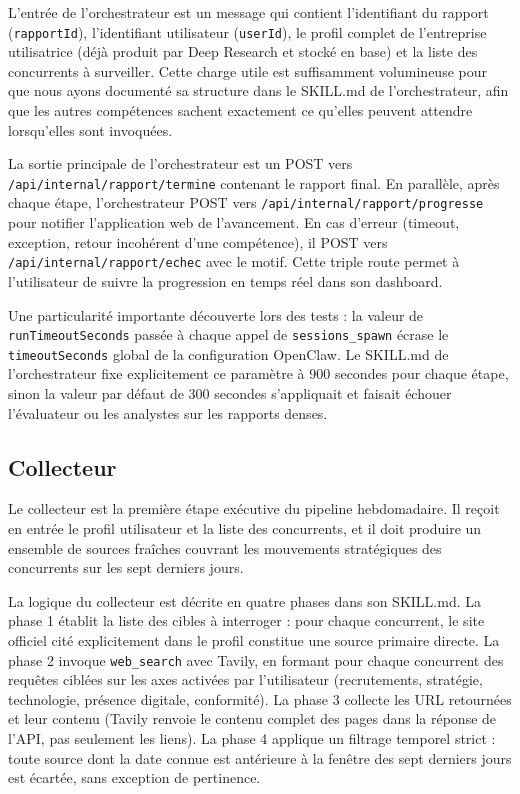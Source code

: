 \documentclass[12pt,a4paper,openany]{report}
\begin{document}
L'entrée de l'orchestrateur est un message qui contient l'identifiant du rapport (\texttt{rapportId}), l'identifiant utilisateur (\texttt{userId}), le profil complet de l'entreprise utilisatrice (déjà produit par Deep Research et stocké en base) et la liste des concurrents à surveiller. Cette charge utile est suffisamment volumineuse pour que nous ayons documenté sa structure dans le SKILL.md de l'orchestrateur, afin que les autres compétences sachent exactement ce qu'elles peuvent attendre lorsqu'elles sont invoquées.

La sortie principale de l'orchestrateur est un POST vers \texttt{/api/internal/rapport/termine} contenant le rapport final. En parallèle, après chaque étape, l'orchestrateur POST vers \texttt{/api/internal/rapport/progresse} pour notifier l'application web de l'avancement. En cas d'erreur (timeout, exception, retour incohérent d'une compétence), il POST vers \texttt{/api/internal/rapport/echec} avec le motif. Cette triple route permet à l'utilisateur de suivre la progression en temps réel dans son dashboard.

Une particularité importante découverte lors des tests : la valeur de \texttt{runTimeoutSeconds} passée à chaque appel de \texttt{sessions\_spawn} écrase le \texttt{timeoutSeconds} global de la configuration OpenClaw. Le SKILL.md de l'orchestrateur fixe explicitement ce paramètre à 900 secondes pour chaque étape, sinon la valeur par défaut de 300 secondes s'appliquait et faisait échouer l'évaluateur ou les analystes sur les rapports denses.

\subsection{Collecteur}
\label{sec:skill-collecteur}

Le collecteur est la première étape exécutive du pipeline hebdomadaire. Il reçoit en entrée le profil utilisateur et la liste des concurrents, et il doit produire un ensemble de sources fraîches couvrant les mouvements stratégiques des concurrents sur les sept derniers jours.

La logique du collecteur est décrite en quatre phases dans son SKILL.md. La phase 1 établit la liste des cibles à interroger : pour chaque concurrent, le site officiel cité explicitement dans le profil constitue une source primaire directe. La phase 2 invoque \texttt{web\_search} avec Tavily, en formant pour chaque concurrent des requêtes ciblées sur les axes activées par l'utilisateur (recrutements, stratégie, technologie, présence digitale, conformité). La phase 3 collecte les URL retournées et leur contenu (Tavily renvoie le contenu complet des pages dans la réponse de l'API, pas seulement les liens). La phase 4 applique un filtrage temporel strict : toute source dont la date connue est antérieure à la fenêtre des sept derniers jours est écartée, sans exception de pertinence.
\end{document}
